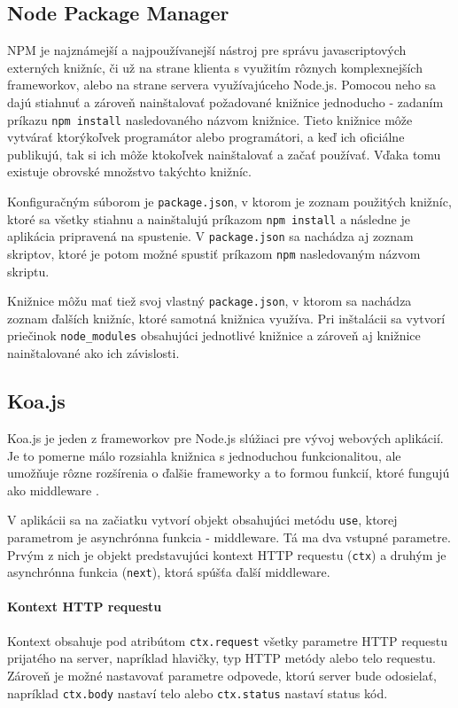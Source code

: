 \documentclass[
  digital, %
  table,   %
  lof,     %
  lot,     %
]{fithesis3}
\begin{document}
\subsection{Node Package Manager}
NPM je najznámejší a najpoužívanejší nástroj pre správu javascriptových externých knižníc, či už na strane klienta s využitím rôznych komplexnejších frameworkov, alebo na strane servera využívajúceho Node.js. Pomocou neho sa dajú stiahnuť a zároveň nainštalovať požadované knižnice jednoducho - zadaním príkazu \texttt{npm install} nasledovaného názvom knižnice. Tieto knižnice môže vytvárať ktorýkoľvek programátor alebo programátori, a keď ich oficiálne publikujú, tak si ich môže ktokoľvek nainštalovať a začať používať. Vďaka tomu existuje obrovské množstvo takýchto knižníc.

Konfiguračným súborom je \texttt{package.json}, v ktorom je zoznam použitých knižníc, ktoré sa všetky stiahnu a nainštalujú príkazom \texttt{npm install} a následne je aplikácia pripravená na spustenie. V \texttt{package.json} sa nachádza aj zoznam skriptov, ktoré je potom možné spustiť príkazom \texttt{npm} nasledovaným názvom skriptu.

Knižnice môžu mať tiež svoj vlastný \texttt{package.json}, v ktorom sa nachádza zoznam ďalších knižníc, ktoré samotná knižnica využíva. Pri inštalácii sa vytvorí priečinok \texttt{node\_modules} obsahujúci jednotlivé knižnice a zároveň aj knižnice nainštalované ako ich závislosti.

\subsection{Koa.js}
Koa.js je jeden z frameworkov pre Node.js slúžiaci pre vývoj webových aplikácií. Je to pomerne málo rozsiahla knižnica s jednoduchou funkcionalitou, ale umožňuje rôzne rozšírenia o ďalšie frameworky a to formou funkcií, ktoré fungujú ako middleware \parencite{koajs}.

V aplikácii sa na začiatku vytvorí objekt obsahujúci metódu \texttt{use}, ktorej parametrom je asynchrónna funkcia - middleware. Tá ma dva vstupné parametre. Prvým z nich je objekt predstavujúci kontext HTTP requestu (\texttt{ctx}) a druhým je asynchrónna funkcia (\texttt{next}), ktorá spúšťa ďalší middleware.

\paragraph{Kontext HTTP requestu}
Kontext obsahuje pod atribútom \texttt{ctx.request} všetky parametre HTTP requestu prijatého na server, napríklad hlavičky, typ HTTP metódy alebo telo requestu. Zároveň je možné nastavovať parametre odpovede, ktorú server bude odosielať, napríklad \texttt{ctx.body} nastaví telo alebo \texttt{ctx.status} nastaví status kód.
\end{document}
